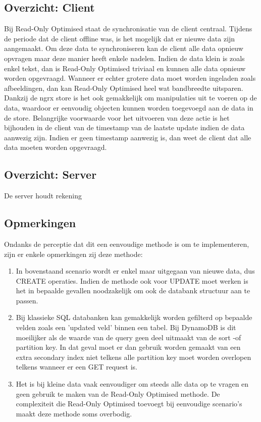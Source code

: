 \subsection{Overzicht: Client}
Bij Read-Only Optimised staat de synchronisatie van de client centraal. Tijdens de periode dat de client offline was, is het mogelijk dat er nieuwe data zijn aangemaakt. Om deze data te synchroniseren kan de client alle data opnieuw opvragen maar deze manier heeft enkele nadelen. Indien de data klein is zoals enkel tekst, dan is Read-Only Optimised triviaal en kunnen alle data opnieuw worden opgevraagd. Wanneer er echter grotere data moet worden ingeladen zoals afbeeldingen, dan kan Read-Only Optimised heel wat bandbreedte uitsparen. Dankzij de ngrx store is het ook gemakkelijk om manipulaties uit te voeren op de data, waardoor er eenvoudig objecten kunnen worden toegevoegd aan de data in de store. Belangrijke voorwaarde voor het uitvoeren van deze actie is het bijhouden in de client van de timestamp van de laatste update indien de data aanwezig zijn. Indien er geen timestamp aanwezig is, dan weet de client dat alle data moeten worden opgevraagd.
\subsection{Overzicht: Server}
De server houdt rekening 

\subsection{Opmerkingen}
Ondanks de perceptie dat dit een eenvoudige methode is om te implementeren, zijn er enkele opmerkingen zij deze methode:
\begin{enumerate}
\item In bovenstaand scenario wordt er enkel maar uitgegaan van nieuwe data, dus CREATE operaties. Indien de methode ook voor UPDATE moet werken is het in bepaalde gevallen noodzakelijk om ook de databank structuur aan te passen.
\item Bij klassieke SQL databanken kan gemakkelijk worden gefilterd op bepaalde velden zoals een 'updated veld' binnen een tabel. Bij DynamoDB is dit moeilijker als de waarde van de query geen deel uitmaakt van de sort -of partition key. In dat geval moet er dan gebruik worden gemaakt van een extra secondary index niet telkens alle partition key moet worden overlopen telkens wanneer er een GET request is.
\item Het is bij kleine data vaak eenvoudiger om steeds alle data op te vragen en geen gebruik te maken van de Read-Only Optimised methode. De complexiteit die Read-Only Optimised toevoegt bij eenvoudige scenario's maakt deze methode soms overbodig.
\end{enumerate}
